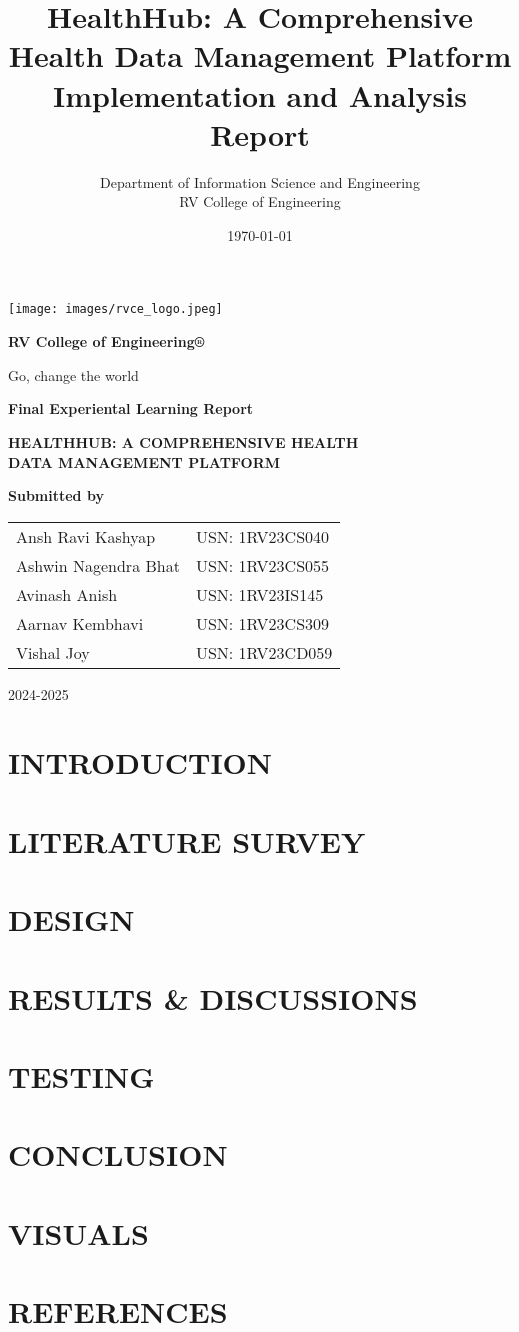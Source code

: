 \documentclass[12pt]{report}
\title{\fontsize{16}{19}\selectfont HealthHub: A Comprehensive Health Data Management Platform\\
       Implementation and Analysis Report}
\author{Department of Information Science and Engineering\\
        RV College of Engineering}
\date{\today}
\renewcommand{\maketitle}{
    \begin{titlepage}
        \centering
        \vspace*{-1cm}
        
        \texttt{[image: images/rvce\_logo.jpeg]}\par\vspace{0.5cm}
        {\huge\bfseries RV College of Engineering®\par}
        \vspace{0.5cm}
        {\Large Go, change the world\par}
        \vspace{1cm}
        
        
        {\Large\bfseries Final Experiental Learning Report\par}
        \vspace{0.5cm}
        
        {\Large\bfseries HEALTHHUB: A COMPREHENSIVE HEALTH\\
        DATA MANAGEMENT PLATFORM\par}
        \vspace{1.5cm}
        
        {\large\bfseries Submitted by\par}
        \vspace{0.5cm}
        \begin{tabular}{ll}
            Ansh Ravi Kashyap & USN: 1RV23CS040 \\
            Ashwin Nagendra Bhat & USN: 1RV23CS055 \\
            Avinash Anish & USN: 1RV23IS145 \\
            Aarnav Kembhavi & USN: 1RV23CS309 \\
            Vishal Joy & USN: 1RV23CD059
            
            
        \end{tabular}
        \vspace{1.5cm}
        
        
        {\large 2024-2025}
    \end{titlepage}
}
\begin{document}
\maketitle

\tableofcontents
\newpage



\chapter{INTRODUCTION}

\chapter{LITERATURE SURVEY}

\chapter{DESIGN}

\chapter{RESULTS \& DISCUSSIONS}

\chapter{TESTING}


\chapter{CONCLUSION}


\chapter{VISUALS}


\chapter*{REFERENCES}

\end{document}
